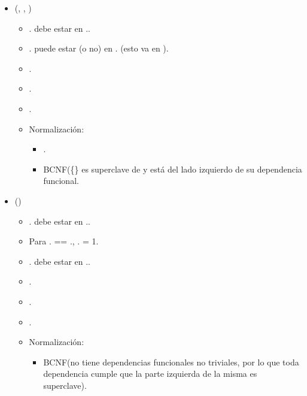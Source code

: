 \begin{itemize}
        \item {}(, , 
            )
            \begin{itemize}
                \item {}. debe estar en 
                    ..
                \item {}. puede estar (o no) en 
                    . (esto va en ).
                \item {}.
                \item {}.
                \item {}.
                \item Normalización:
                    \begin{itemize}
                        \item {}.
                        \item BCNF(\{\} es superclave de 
                             y está del lado izquierdo de su 
                            dependencia funcional.
                    \end{itemize}
            \end{itemize}


        \item {}()
            \begin{itemize}
                \item {}. debe estar en 
                    ..
                \item Para . == 
                    ., 
                    . = 1.
                \item {}. debe estar en 
                    ..
                \item {}.
                \item {}.
                \item \PK{$\emptyset$}.
                \item Normalización:
                    \begin{itemize}
                        \item BCNF(no tiene dependencias funcionales no 
                            triviales, por lo que toda dependencia cumple que
                            la parte izquierda de la misma es superclave).
                    \end{itemize}
            \end{itemize}


\end{itemize}
